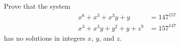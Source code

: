 Prove that the system \begin{align*}

x^6+x^3+x^3y+y & = 147^{157} \\

x^3+x^3y+y^2+y+z^9 & = 157^{147}

\end{align*} has no solutions in integers $x$,  $y$,  and $z$.